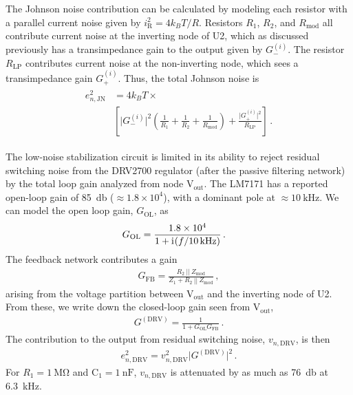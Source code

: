 \documentclass[aip,rsi,reprint]{revtex4-1} %
\newcommand{\iu}{\mathrm{i}\mkern1mu}
\begin{document}
The Johnson noise contribution can be calculated by modeling each resistor with a parallel current noise given by $i_\text{R}^2 = 4k_B T/R$.
Resistors $R_1$, $R_2$, and $R_\text{mod}$ all contribute current noise at the inverting node of U2, which as discussed previously has a transimpedance gain to the output given by $G_{-}^{(i)}$.
The resistor $R_\text{LP}$ contributes current noise at the non-inverting node, which sees a transimpedance gain $G_{+}^{(i)}$.
Thus, the total Johnson noise is
\begin{align}
\begin{split}
e^2_{n,\text{JN}} &= 4 k_B T \times \\
&\left[ \big|G_{-}^{(i)}\big|^2 \left(\frac{1}{R_1} + \frac{1}{R_2} + \frac{1}{R_\text{mod}} \right) + 
\frac{\big|G_{+}^{(i)}\big|^2}{R_\text{LP}} \right]\,.
\end{split}
\end{align}

The low-noise stabilization circuit is limited in its ability to reject residual switching noise from the DRV2700 regulator (after the passive filtering network) by the total loop gain analyzed from node $\text{V}_\text{out}$.
The LM7171 has a reported open-loop gain of \SI{85}{\decibel} ($\approx 1.8\times 10^4$), with a dominant pole at $\approx\SI{10}{\kilo\hertz}$.\cite{LM7171Datasheet}
We can model the open loop gain, $G_\text{OL}$, as
\begin{align}
G_\text{OL} &= \frac{1.8\times10^4}{1 + \iu (f/\SI{10}{\kilo\hertz})}\,.
\end{align}
The feedback network contributes a gain
\begin{align}
G_\text{FB} = \frac{R_2~||~Z_\text{mod}}{Z_1 + R_2~||~Z_\text{mod}}\,,
\end{align}
arising from the voltage partition between $\text{V}_\text{out}$ and the inverting node of U2.
From these, we write down the closed-loop gain seen from $\text{V}_\text{out}$,
\begin{align}
G^{(\text{DRV})} = \frac{1}{1+G_\text{OL} G_\text{FB}}\,.
\end{align}
The contribution to the output from residual switching noise, $v_{n,\text{DRV}}$, is then
\begin{align}
e^2_{n,\text{DRV}} = v^2_{n,\text{DRV}}\big|G^{(\text{DRV})}\big|^2\,.
\end{align}
For $R_1=\SI{1}{\mega\ohm}$ and $\text{C}_1 = \SI{1}{\nano\farad}$, $v_{n,\text{DRV}}$ is attenuated by as much as \SI{76}{\decibel} at \SI{6.3}{\kilo\hertz}.
\end{document}
